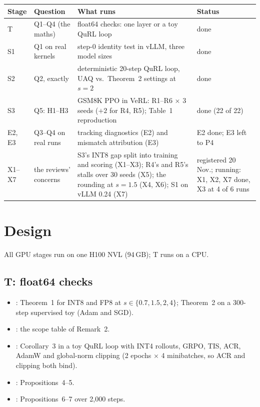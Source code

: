 \documentclass[11pt]{article}
\begin{document}
\begin{center}\small
\begin{tabularx}{\linewidth}{@{}l l L >{\raggedright\arraybackslash}p{3.6cm}@{}}
\toprule
Stage & Question & What runs & Status\\
\midrule
T & Q1--Q4 (the maths) & float64 checks: one layer or a toy QuRL loop & done\\
S1 & Q1 on real kernels & step-0 identity test in vLLM, three model sizes & done\\
S2 & Q2, exactly & deterministic 20-step QuRL loop, UAQ vs.\ Theorem~2 settings at $s=2$ & done\\
S3 & Q5: H1--H3 & GSM8K PPO in VeRL: R1--R6 $\times$ 3 seeds ($+2$ for R4, R5); Table~1 reproduction & done (22 of 22)\\
E2, E3 & Q3--Q4 on real runs & tracking diagnostics (E2) and mismatch attribution (E3) & E2 done; E3 left to P4\\
X1--X7 & the reviews' concerns & S3's INT8 gap split into training and scoring (X1--X3); R4's and R5's stalls over 30 seeds (X5); the rounding at $s=1.5$ (X4, X6); S1 on vLLM 0.24 (X7) & registered 20 Nov.; running: X1, X2, X7 done, X3 at 4 of 6 runs\\
\bottomrule
\end{tabularx}
\end{center}

\section{Design}\label{sec:design}
All GPU stages run on one H100 NVL (94\,GB); T runs on a CPU.

\subsection{T: float64 checks}\label{sec:t}
\begin{itemize}
\item {}: Theorem~1 for INT8 and FP8 at $s\in\{0.7,1.5,2,4\}$; Theorem~2 on a 300-step supervised toy (Adam and SGD).
\item {}: the scope table of Remark~2.
\item {}: Corollary~3 in a toy QuRL loop with INT4 rollouts, GRPO, TIS, ACR, AdamW and global-norm clipping (2 epochs $\times$ 4 minibatches, so ACR and clipping both bind).
\item {}: Propositions~4--5.
\item {}: Propositions~6--7 over 2{,}000 steps.
\end{itemize}
\end{document}
